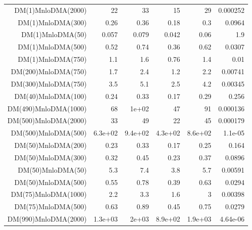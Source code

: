 \begin{table}[hbtp]
\begin{center}
{\begin{tabular}{rrrrrr}
DM(1)MnloDMA(2000)        & 22           & 33           & 15           & 29           & 0.000252        \\
DM(1)MnloDMA(300)         & 0.26         & 0.36         & 0.18         & 0.3          & 0.0964          \\
DM(1)MnloDMA(50)          & 0.057        & 0.079        & 0.042        & 0.06         & 1.9             \\
DM(1)MnloDMA(500)         & 0.52         & 0.74         & 0.36         & 0.62         & 0.0307          \\
DM(1)MnloDMA(750)         & 1.1          & 1.6          & 0.76         & 1.4          & 0.01            \\
DM(200)MnloDMA(750)       & 1.7          & 2.4          & 1.2          & 2.2          & 0.00741         \\
DM(300)MnloDMA(750)       & 3.5          & 5.1          & 2.5          & 4.2          & 0.00345         \\
DM(40)MnloDMA(100)        & 0.24         & 0.33         & 0.17         & 0.29         & 0.256           \\
DM(490)MnloDMA(1000)      & 68           & 1e+02        & 47           & 91           & 0.000136        \\
DM(500)MnloDMA(2000)      & 33           & 49           & 22           & 45           & 0.000179        \\
DM(500)MnloDMA(500)       & 6.3e+02      & 9.4e+02      & 4.3e+02      & 8.6e+02      & 1.1e-05         \\
DM(50)MnloDMA(200)        & 0.23         & 0.33         & 0.17         & 0.25         & 0.164           \\
DM(50)MnloDMA(300)        & 0.32         & 0.45         & 0.23         & 0.37         & 0.0896          \\
DM(50)MnloDMA(50)         & 5.3          & 7.4          & 3.8          & 5.7          & 0.00591         \\
DM(50)MnloDMA(500)        & 0.55         & 0.78         & 0.39         & 0.63         & 0.0294          \\
DM(75)MnloDMA(1000)       & 2.2          & 3.3          & 1.6          & 3            & 0.00398         \\
DM(75)MnloDMA(500)        & 0.63         & 0.89         & 0.45         & 0.75         & 0.0279          \\
DM(990)MnloDMA(2000)      & 1.3e+03      & 2e+03        & 8.9e+02      & 1.9e+03      & 4.64e-06        \\
\hline
\end{tabular}
}
  \end{center}
\end{table}


